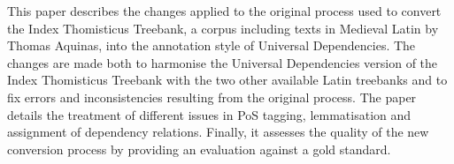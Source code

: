 This paper describes the changes applied to the original process used to convert the Index Thomisticus Treebank, a corpus including texts in Medieval Latin by Thomas Aquinas, into the annotation style of Universal Dependencies. The changes are made both to harmonise the Universal Dependencies version of the Index Thomisticus Treebank with the two other available Latin treebanks and to fix errors and inconsistencies resulting from the original process. The paper details the treatment of different issues in PoS tagging, lemmatisation and assignment of dependency relations. Finally, it assesses the quality of the new conversion process by providing an evaluation against a gold standard.
